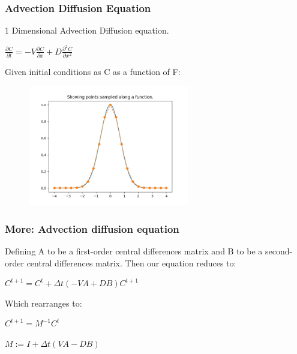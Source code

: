 \documentclass{beamer}
\begin{document}
\begin{frame}
\frametitle{Advection Diffusion Equation}

1 Dimensional Advection Diffusion equation.

\begin{center}
    $\frac{\partial C}{\partial t} = - V\frac{\partial C}{\partial x} + D\frac{\partial^2 C}{\partial x^2}$
\end{center}

Given initial conditions as C as a function of F:

\begin{figure}
\centering
    \includegraphics[width=7cm]{images/show_sampling.png}
    \label{fig:sampling}
\end{figure}

\end{frame}

\begin{frame}
\frametitle{More: Advection diffusion equation}

Defining A to be a first-order central differences matrix and B to be a second-order central differences matrix. Then our equation reduces to:
\begin{center}
    $C^{t+1} = C^{t} + \Delta t (-VA + DB) C^{t+1}$
\end{center}

Which rearranges to:

\begin{center}
    $C^{t+1} = M^{-1} C^{t}$
    
    $M := I + \Delta t(VA - DB)$
\end{center}

\end{frame}
\end{document}
